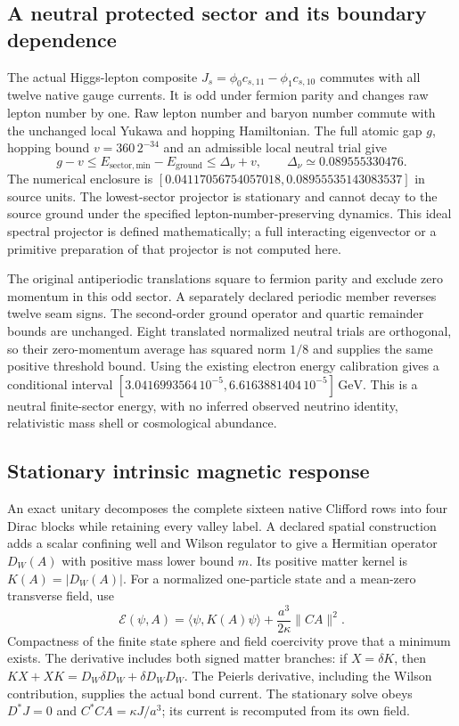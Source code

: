 \subsection{A neutral protected sector and its boundary dependence}

The actual Higgs-lepton composite
$J_s=\phi_0c_{s,11}-\phi_1c_{s,10}$ commutes with all twelve native
gauge currents. It is odd under fermion parity and changes raw lepton
number by one. Raw lepton number and baryon number commute with the
unchanged local Yukawa and hopping Hamiltonian. The full atomic gap
$g$, hopping bound $v=360\,2^{-34}$ and an admissible local neutral
trial give
\[
 g-v\leq E_{\mathrm{sector,min}}-E_{\mathrm{ground}}
       \leq\Delta_\nu+v,
 \qquad \Delta_\nu\simeq0.089555330476.
\]
The numerical enclosure is $[0.04117056754057018,
0.08955535143083537]$ in source units. The lowest-sector projector is
stationary and cannot decay to the source ground under the specified
lepton-number-preserving dynamics. This ideal spectral projector is defined
mathematically; a full interacting eigenvector or a primitive
preparation of that projector is not computed here.

The original antiperiodic translations square to fermion parity and
exclude zero momentum in this odd sector. A separately declared periodic
member reverses twelve seam signs. The second-order ground operator
and quartic remainder bounds are unchanged. Eight translated normalized neutral
trials are orthogonal, so their zero-momentum average has squared norm
$1/8$ and supplies the same positive threshold bound. Using the
existing electron energy calibration gives a conditional interval
$[3.0416993564\,10^{-5},6.6163881404\,10^{-5}]\,\mathrm{GeV}$.
This is a neutral finite-sector energy, with no inferred observed
neutrino identity, relativistic mass shell or cosmological abundance.

\subsection{Stationary intrinsic magnetic response}

An exact unitary decomposes the complete sixteen native Clifford rows
into four Dirac blocks while retaining every valley label. A declared
spatial construction adds a scalar confining well and Wilson regulator
to give a Hermitian operator $D_W(A)$ with positive mass lower bound
$m$. Its positive matter kernel is $K(A)=|D_W(A)|$. For a normalized
one-particle state and a mean-zero transverse field, use
\[
 \mathcal E(\psi,A)=\langle\psi,K(A)\psi\rangle
              +\frac{a^3}{2\kappa}\|CA\|^2.
\]
Compactness of the finite state sphere and field coercivity prove that
a minimum exists. The derivative includes both signed matter branches:
if $X=\delta K$, then
$KX+XK=D_W\delta D_W+\delta D_WD_W$.
The Peierls derivative, including the Wilson contribution, supplies
the actual bond current. The stationary solve obeys
$D^*J=0$ and $C^*CA=\kappa J/a^3$; its current is recomputed from
its own field.

